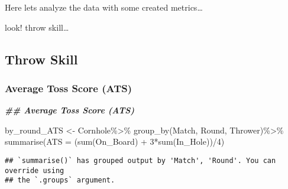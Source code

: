 \documentclass[
]{article}
\newenvironment{Shaded}{\begin{snugshade}}{\end{snugshade}}
\newcommand{\AttributeTok}[1]{\textcolor[rgb]{0.77,0.63,0.00}{#1}}
\newcommand{\CommentTok}[1]{\textcolor[rgb]{0.56,0.35,0.01}{\textit{#1}}}
\newcommand{\DecValTok}[1]{\textcolor[rgb]{0.00,0.00,0.81}{#1}}
\newcommand{\DocumentationTok}[1]{\textcolor[rgb]{0.56,0.35,0.01}{\textbf{\textit{#1}}}}
\newcommand{\FunctionTok}[1]{\textcolor[rgb]{0.00,0.00,0.00}{#1}}
\newcommand{\NormalTok}[1]{#1}
\newcommand{\OtherTok}[1]{\textcolor[rgb]{0.56,0.35,0.01}{#1}}
\newcommand{\SpecialCharTok}[1]{\textcolor[rgb]{0.00,0.00,0.00}{#1}}
\begin{document}
Here lets analyze the data with some created metrics\ldots{}

look! throw skill\ldots{}

\hypertarget{throw-skill}{%
\subsection{Throw Skill}\label{throw-skill}}

\hypertarget{average-toss-score-ats}{%
\subsubsection{Average Toss Score (ATS)}\label{average-toss-score-ats}}

\begin{Shaded}
\begin{Highlighting}[]
\DocumentationTok{\#\# Average Toss Score (ATS)}

\NormalTok{by\_round\_ATS }\OtherTok{\textless{}{-}}\NormalTok{ Cornhole}\SpecialCharTok{\%\textgreater{}\%}
  \FunctionTok{group\_by}\NormalTok{(Match, Round, Thrower)}\SpecialCharTok{\%\textgreater{}\%}
  \FunctionTok{summarise}\NormalTok{(}\AttributeTok{ATS =}\NormalTok{ (}\FunctionTok{sum}\NormalTok{(On\_Board) }\SpecialCharTok{+} \DecValTok{3}\SpecialCharTok{*}\FunctionTok{sum}\NormalTok{(In\_Hole))}\SpecialCharTok{/}\DecValTok{4}\NormalTok{)}
\end{Highlighting}
\end{Shaded}

\begin{verbatim}
## `summarise()` has grouped output by 'Match', 'Round'. You can override using
## the `.groups` argument.
\end{verbatim}

\begin{Shaded}
\end{Shaded}
\end{document}
